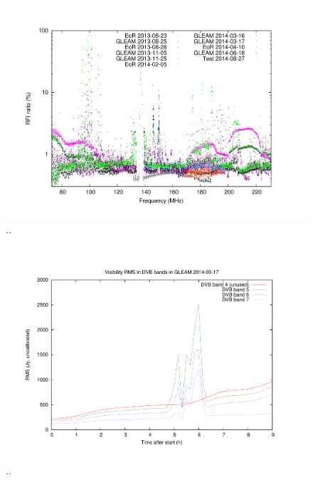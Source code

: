 \documentclass[useAMS,usenatbib]{mn2e}
\begin{document}
\noindent\begin{figure}
\begin{center}\hspace*{-0.2cm}\includegraphics[width=18cm]{img/plot-rfi-per-set}\vspace{-1cm}
\caption{..}
\label{fig:rfi-per-set}
\end{center}
\end{figure}

\noindent\begin{figure}
\begin{center}\hspace*{-0.2cm}\includegraphics[width=18cm]{img/2014-03-17-dvb-stddevs}\vspace{-1cm}
\caption{..}
\label{fig:dvb-stddevs}
\end{center}
\end{figure}
\end{document}
